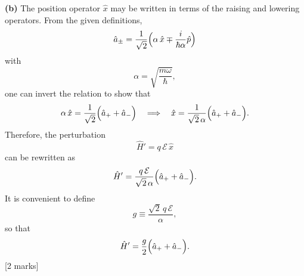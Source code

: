 \documentclass{article}
\begin{document}
\bigskip

\textbf{(b)} The position operator \(\hat{x}\) may be written in terms of the raising and lowering operators. From the given definitions,
\[
\hat{a}_\pm = \frac{1}{\sqrt{2}}\Bigl(\alpha\,\hat{x} \mp \frac{i}{\hbar\alpha}\hat{p}\Bigr)
\]
with 
\[
\alpha = \sqrt{\frac{m\omega}{\hbar}},
\]
one can invert the relation to show that
\[
\alpha\,\hat{x} = \frac{1}{\sqrt{2}}\Bigl(\hat{a}_+ + \hat{a}_-\Bigr)
\quad\Longrightarrow\quad
\hat{x} = \frac{1}{\sqrt{2}\,\alpha}\Bigl(\hat{a}_+ + \hat{a}_-\Bigr).
\]
Therefore, the perturbation
\[
\hat{H}' = q\,\mathcal{E}\,\hat{x}
\]
can be rewritten as
\[
\hat{H}' = \frac{q\,\mathcal{E}}{\sqrt{2}\,\alpha}\Bigl(\hat{a}_+ + \hat{a}_-\Bigr).
\]
It is convenient to define
\[
g \equiv \frac{\sqrt{2}\,q\,\mathcal{E}}{\alpha},
\]
so that
\[
\hat{H}' = \frac{g}{2}\Bigl(\hat{a}_+ + \hat{a}_-\Bigr).
\]
\hfill [2 marks]

\bigskip
\end{document}
